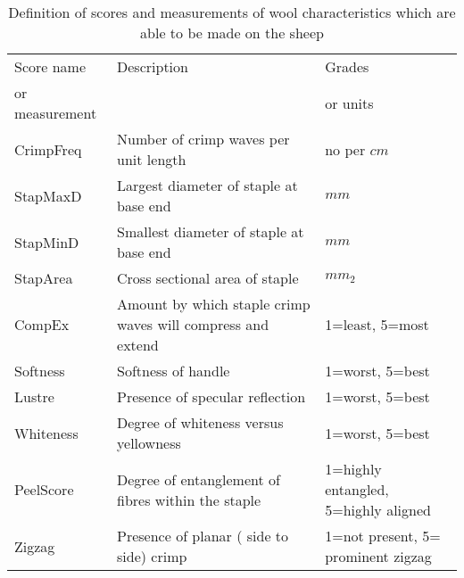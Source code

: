 %

\begin{table}[htp]
\centering
\caption{Definition of scores and measurements of wool characteristics which are able to be made on the sheep}
\label{tab:scores}
\vspace{0.1in}
\begin{tabular}{|p{1.0in}|p{2.5in}|p{0.9in}|}  \hline
     Score name & Description  & Grades  \\ 
  or measurement  &    & or units  \\ \hline
  CrimpFreq    & Number of crimp waves per unit length  & no per $cm$ \\
  StapMaxD     & Largest diameter of staple  at base end    & $mm$        \\
  StapMinD     & Smallest diameter of staple at base end    & $mm$        \\
  StapArea     & Cross sectional area of staple         & $mm_{2}$    \\ \hline
  CompEx       & Amount by which staple crimp waves will compress and extend  & 1=least, 5=most  \\
  Softness     & Softness of handle                     & 1=worst, 5=best   \\
  Lustre       & Presence of specular reflection        & 1=worst, 5=best   \\
  Whiteness    & Degree of whiteness versus yellowness  & 1=worst, 5=best   \\
  PeelScore    & Degree of entanglement of fibres  within the staple   &   1=highly entangled, 5=highly aligned   \\
  Zigzag       & Presence of planar ( side to side) crimp     & 1=not present, 5= prominent zigzag              \\ \hline
\end{tabular}
\end{table}

%
